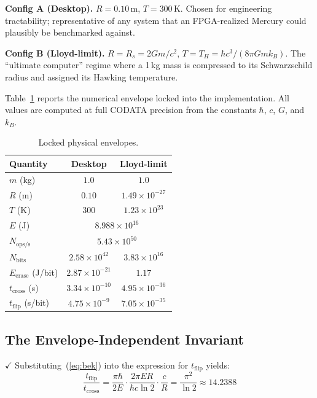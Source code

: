 \documentclass[conference,letterpaper,10pt]{IEEEtran}
\newcommand{\Verified}{\textbf{\textcolor[rgb]{0.0,0.5,0.0}{$\checkmark$}}}
\begin{document}
\noindent\textbf{Config A (Desktop).} $R = 0.10$\,m, $T = 300$\,K.
Chosen for engineering tractability; representative of any system
that an FPGA-realized Mercury could plausibly be benchmarked
against.

\noindent\textbf{Config B (Lloyd-limit).} $R = R_s = 2Gm/c^2$,
$T = T_H = \hbar c^3 / (8\pi G m k_B)$. The ``ultimate computer''
regime where a 1\,kg mass is compressed to its Schwarzschild
radius and assigned its Hawking temperature.

Table~\ref{tab:envelopes} reports the numerical envelope locked
into the implementation. All values are computed at full CODATA
precision from the constants $\hbar$, $c$, $G$, and $k_B$.

\begin{table}[t]
\centering
\caption{Locked physical envelopes.}
\label{tab:envelopes}
\renewcommand{\arraystretch}{1.25}
\begin{tabular}{lcc}
\toprule
\textbf{Quantity} & \textbf{Desktop} & \textbf{Lloyd-limit} \\
\midrule
$m$ (kg)                         & $1.0$                  & $1.0$ \\
$R$ (m)                          & $0.10$                 & $1.49\times10^{-27}$ \\
$T$ (K)                          & $300$                  & $1.23\times10^{23}$ \\
$E$ (J)                          & \multicolumn{2}{c}{$8.988\times10^{16}$} \\
$N_{\mathrm{ops/s}}$             & \multicolumn{2}{c}{$5.43\times10^{50}$} \\
$N_{\mathrm{bits}}$              & $2.58\times10^{42}$    & $3.83\times10^{16}$ \\
$E_{\mathrm{erase}}$ (J/bit)     & $2.87\times10^{-21}$   & $1.17$ \\
$t_{\mathrm{cross}}$ (s)         & $3.34\times10^{-10}$   & $4.95\times10^{-36}$ \\
$t_{\mathrm{flip}}$ (s/bit)      & $4.75\times10^{-9}$    & $7.05\times10^{-35}$ \\
\bottomrule
\end{tabular}
\end{table}

\subsection{The Envelope-Independent Invariant}
\label{sec:invariant}

\Verified{} Substituting~(\ref{eq:bek}) into the expression for
$t_{\mathrm{flip}}$ yields:
\begin{equation}
    \frac{t_{\mathrm{flip}}}{t_{\mathrm{cross}}}
    = \frac{\pi \hbar}{2 E} \cdot \frac{2\pi E R}{\hbar c \ln 2}
      \cdot \frac{c}{R}
    = \frac{\pi^2}{\ln 2}
    \approx 14.2388
    \label{eq:invariant}
\end{equation}
\end{document}
